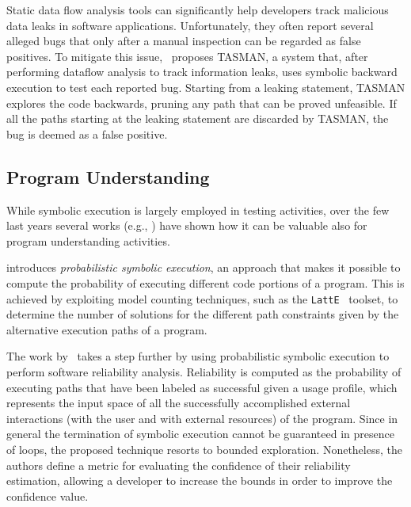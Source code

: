 
\smallskip
Static data flow analysis tools can significantly help developers track malicious data leaks in software applications. Unfortunately, they often report several alleged bugs that only after a manual inspection can be regarded as false positives. To mitigate this issue,~\cite{ARH-SOAP15} proposes TASMAN, a system that, after performing dataflow analysis to track information leaks, uses symbolic backward execution to test each reported bug. Starting from a leaking statement, TASMAN explores the code backwards, pruning any path that can be proved unfeasible. If all the paths starting at the leaking statement are discarded by TASMAN, the bug is deemed as a false positive.

\subsection{Program Understanding}
While symbolic execution is largely employed in testing activities, over the few last years several works (e.g., \cite{GDV-ISSTA12,FPV-ICSE13,CLL-ICSE16}) have shown how it can be valuable also for program understanding activities.

\cite{GDV-ISSTA12} introduces {\em probabilistic symbolic execution}, an approach that makes it possible to compute the probability of executing different code portions of a program. This is achieved by exploiting model counting techniques, such as the {\tt LattE}~\cite{LHT-JSC04} toolset, to determine the number of solutions for the different path constraints given by the alternative execution paths of a program.

The work by~\cite{FPV-ICSE13} takes a step further by using probabilistic symbolic execution to perform software reliability analysis. Reliability is computed as the probability of executing paths that have been labeled as successful given a usage profile, which represents the input space of all the successfully accomplished external interactions (with the user and with external resources) of the program.  Since in general the termination of symbolic execution cannot be guaranteed in presence of loops, the proposed technique resorts to bounded exploration. Nonetheless, the authors define a metric for evaluating the confidence of their reliability estimation, allowing a developer to increase the bounds in order to improve the confidence value.

